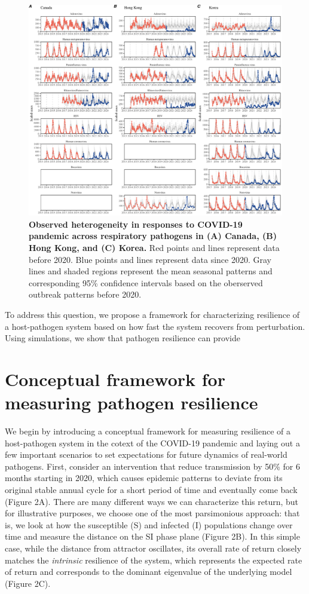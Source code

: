 \documentclass[12pt]{article}
\begin{document}
\begin{figure}[!th]
\includegraphics[width=\textwidth]{../figure1/figure1.pdf}
\caption{
\textbf{Observed heterogeneity in responses to COVID-19 pandemic across respiratory pathogens in (A) Canada, (B) Hong Kong, and (C) Korea.}
Red points and lines represent data before 2020.
Blue points and lines represent data since 2020.
Gray lines and shaded regions represent the mean seasonal patterns and corresponding 95\% confidence intervals based on the oberserved outbreak patterns before 2020.
}
\end{figure}

To address this question, we propose a framework for characterizing resilience of a host-pathogen system based on how fast the system recovers from perturbation.
Using simulations, we show that pathogen resilience can provide 

\section*{Conceptual framework for measuring pathogen resilience}

We begin by introducing a conceptual framework for measuring resilience of a host-pathogen system in the cotext of the COVID-19 pandemic and laying out a few important scenarios to set expectations for future dynamics of real-world pathogens.
First, consider an intervention that reduce transmission by 50\% for 6 months starting in 2020, which causes epidemic patterns to deviate from its original stable annual cycle for a short period of time and eventually come back (Figure 2A).
There are many different ways we can characterize this return, but for illustrative purposes, we choose one of the most parsimonious approach: that is, we look at how the susceptible (S) and infected (I) populations change over time and measure the distance on the SI phase plane (Figure 2B).
In this simple case, while the distance from attractor oscillates, its overall rate of return closely matches the \emph{intrinsic} resilience of the system, which represents the expected rate of return and corresponds to the dominant eigenvalue of the underlying model (Figure 2C).
\end{document}
